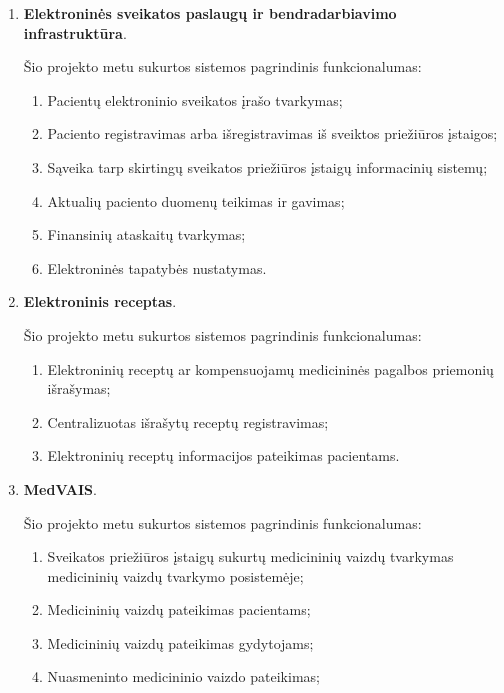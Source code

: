 \begin{enumerate}
    \item \textbf{Elektroninės sveikatos paslaugų ir bendradarbiavimo infrastruktūra}.
    
    Šio projekto metu sukurtos sistemos pagrindinis funkcionalumas:
    \begin{enumerate}
        \item Pacientų elektroninio sveikatos įrašo tvarkymas;
        \item Paciento registravimas arba išregistravimas iš sveiktos priežiūros įstaigos;
        \item Sąveika tarp skirtingų sveikatos priežiūros įstaigų informacinių sistemų;
        \item Aktualių paciento duomenų teikimas ir gavimas;
        \item Finansinių ataskaitų tvarkymas;
        \item Elektroninės tapatybės nustatymas.
    \end{enumerate}
    \item \textbf{Elektroninis receptas}. 
    
    Šio projekto metu sukurtos sistemos pagrindinis funkcionalumas:
    \begin{enumerate}
        \item Elektroninių receptų ar kompensuojamų medicininės pagalbos priemonių išrašymas;
        \item Centralizuotas išrašytų receptų registravimas;
        \item Elektroninių receptų informacijos pateikimas pacientams.
    \end{enumerate}

    \item \textbf{MedVAIS}.
    
    Šio projekto metu sukurtos sistemos pagrindinis funkcionalumas:
    \begin{enumerate}
        \item Sveikatos priežiūros įstaigų sukurtų medicininių vaizdų tvarkymas medicininių vaizdų tvarkymo posistemėje;
        \item Medicininių vaizdų pateikimas pacientams;
        \item Medicininių vaizdų pateikimas gydytojams;
        \item Nuasmeninto medicininio vaizdo pateikimas;
    \end{enumerate}
\end{enumerate}

